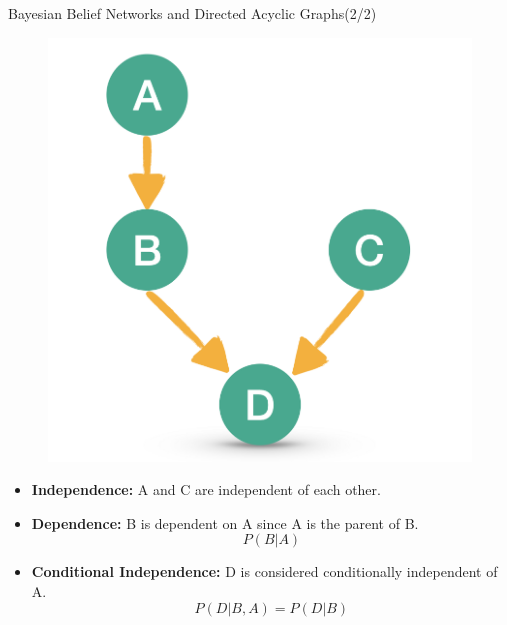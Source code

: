 \documentclass{beamer}
\begin{document}
	\begin{frame}[t]{Bayesian Belief Networks and Directed Acyclic Graphs(2/2)}
	
		\begin{figure}
			\centering
			\includegraphics[scale=0.1]{dag.png}
			
		\end{figure}
		\begin{itemize}
			\item \textbf{Independence:}  A and C are independent of each other.
			\item \textbf{Dependence:} B is dependent on A since A is the parent of B.
			$$P(B | A)$$
			\item \textbf{Conditional Independence:} D is considered conditionally independent of A.
			$$P(D | B, A) = P(D | B)$$
		\end{itemize}
	\end{frame}
\end{document}
